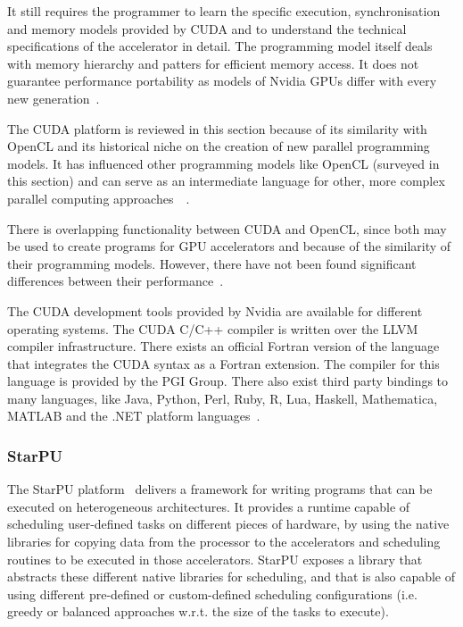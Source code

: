 It still requires the programmer to learn the specific execution, synchronisation and memory models provided by CUDA and to understand the technical specifications of the accelerator in detail. The programming model itself deals with memory hierarchy and patters for efficient memory access. It does not guarantee performance portability as models of Nvidia GPUs differ with every new generation~\cite{6_developer.nvidia.com_2015}.


The CUDA platform is reviewed in this section because of its similarity with OpenCL and its historical niche on the creation of new parallel programming models. It has influenced other programming models like OpenCL (surveyed in this section) and can serve as an intermediate language for other, more complex parallel computing approaches~\cite{malcolm2012arrayfire}~\cite{enmyren2010skepu}.

There is overlapping functionality between CUDA and OpenCL, since both may be used to create programs for GPU accelerators and because of the similarity of their programming models. However, there have not been found significant differences between their performance~\cite{fang2011comprehensive}.

The CUDA development tools provided by Nvidia are available for different operating systems. The CUDA C/C++ compiler is written over the LLVM compiler infrastructure. There exists an official Fortran version of the language that integrates the CUDA syntax as a Fortran extension. The compiler for this language is provided by the PGI Group. There also exist third party bindings to many languages, like Java, Python, Perl, Ruby, R, Lua, Haskell, Mathematica, MATLAB and the .NET platform languages~\cite{5_wikipedia_2015}.

\subsubsection{StarPU}

The StarPU platform~\cite{augonnet2011starpu} delivers a framework for writing programs that can be executed on heterogeneous architectures. It provides a runtime capable of scheduling user-defined tasks on different pieces of hardware, by using the native libraries for copying data from the processor to the accelerators and scheduling routines to be executed in those accelerators. StarPU exposes a library that abstracts these different native libraries for scheduling, and that is also capable of using different pre-defined or custom-defined scheduling configurations (i.e. greedy or balanced approaches w.r.t. the size of the tasks to execute).

